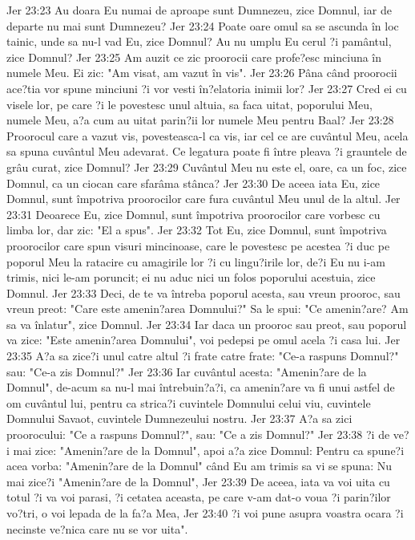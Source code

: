 Jer 23:23  Au doara Eu numai de aproape sunt Dumnezeu, zice Domnul, iar de departe nu mai sunt Dumnezeu?
Jer 23:24  Poate oare omul sa se ascunda în loc tainic, unde sa nu-l vad Eu, zice Domnul? Au nu umplu Eu cerul ?i pamântul, zice Domnul?
Jer 23:25  Am auzit ce zic proorocii care profe?esc minciuna în numele Meu. Ei zic: "Am visat, am vazut în vis".
Jer 23:26  Pâna când proorocii ace?tia vor spune minciuni ?i vor vesti în?elatoria inimii lor?
Jer 23:27  Cred ei cu visele lor, pe care ?i le povestesc unul altuia, sa faca uitat, poporului Meu, numele Meu, a?a cum au uitat parin?ii lor numele Meu pentru Baal?
Jer 23:28  Proorocul care a vazut vis, povesteasca-l ca vis, iar cel ce are cuvântul Meu, acela sa spuna cuvântul Meu adevarat. Ce legatura poate fi între pleava ?i grauntele de grâu curat, zice Domnul?
Jer 23:29  Cuvântul Meu nu este el, oare, ca un foc, zice Domnul, ca un ciocan care sfarâma stânca?
Jer 23:30  De aceea iata Eu, zice Domnul, sunt împotriva proorocilor care fura cuvântul Meu unul de la altul.
Jer 23:31  Deoarece Eu, zice Domnul, sunt împotriva proorocilor care vorbesc cu limba lor, dar zic: "El a spus".
Jer 23:32  Tot Eu, zice Domnul, sunt împotriva proorocilor care spun visuri mincinoase, care le povestesc pe acestea ?i duc pe poporul Meu la ratacire cu amagirile lor ?i cu lingu?irile lor, de?i Eu nu i-am trimis, nici le-am poruncit; ei nu aduc nici un folos poporului acestuia, zice Domnul.
Jer 23:33  Deci, de te va întreba poporul acesta, sau vreun prooroc, sau vreun preot: "Care este amenin?area Domnului?" Sa le spui: "Ce amenin?are? Am sa va înlatur", zice Domnul.
Jer 23:34  Iar daca un prooroc sau preot, sau poporul va zice: "Este amenin?area Domnului", voi pedepsi pe omul acela ?i casa lui.
Jer 23:35  A?a sa zice?i unul catre altul ?i frate catre frate: "Ce-a raspuns Domnul?" sau: "Ce-a zis Domnul?"
Jer 23:36  Iar cuvântul acesta: "Amenin?are de la Domnul", de-acum sa nu-l mai întrebuin?a?i, ca amenin?are va fi unui astfel de om cuvântul lui, pentru ca strica?i cuvintele Domnului celui viu, cuvintele Domnului Savaot, cuvintele Dumnezeului nostru.
Jer 23:37  A?a sa zici proorocului: "Ce a raspuns Domnul?", sau: "Ce a zis Domnul?"
Jer 23:38  ?i de ve?i mai zice: "Amenin?are de la Domnul", apoi a?a zice Domnul: Pentru ca spune?i acea vorba: "Amenin?are de la Domnul" când Eu am trimis sa vi se spuna: Nu mai zice?i "Amenin?are de la Domnul",
Jer 23:39  De aceea, iata va voi uita cu totul ?i va voi parasi, ?i cetatea aceasta, pe care v-am dat-o voua ?i parin?ilor vo?tri, o voi lepada de la fa?a Mea,
Jer 23:40  ?i voi pune asupra voastra ocara ?i necinste ve?nica care nu se vor uita".
